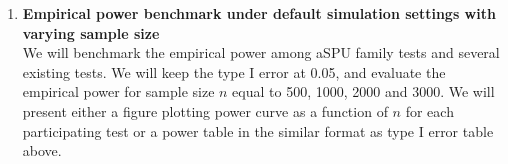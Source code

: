 \documentclass[12pt]{article}
\begin{document}
\begin{enumerate}


\item \textbf{Empirical power benchmark under default simulation settings with varying sample size}\\
We will benchmark the empirical power among aSPU family tests and several existing tests. We will keep the type I error at 0.05, and evaluate the empirical power for sample size $n$ equal to 500, 1000, 2000 and 3000. We will present either a figure plotting power curve as a function of $n$ for each participating test or a power table in the similar format as type I error table above.
%


\end{enumerate}
\end{document}
